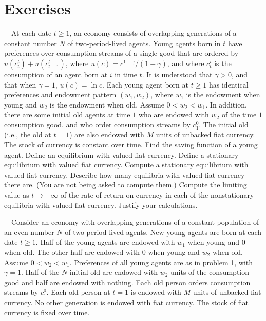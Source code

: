 \showchaptIDfalse
\showsectIDfalse
\section{Exercises}
\showchaptIDtrue
\showsectIDtrue
{} \ \  At each date $t \geq 1$, an  economy
consists of  overlapping generations of  a constant
number $N$ of two-period-lived agents.  Young
agents born in $t$ have preferences over consumption streams of
a single good that are ordered by
$ u(c_t^t) + u(c^t_{t+1}) $, where
$u(c) = c^{1 - \gamma} / (1-\gamma)$, and where $c^i_t$ is the
consumption of an agent born at $i$ in time $t$. It is understood
that $\gamma >0$, and that when $\gamma = 1$, $u(c) = \ln c$.   Each
young agent born at $t \geq 1$ has identical preferences and endowment
pattern
$(w_1,w_2)$, where $w_1$  is the endowment when young and  $w_2$
 is the endowment when old.
Assume $0 < w_2 < w_1$.
 In addition,
there are some initial old agents at time $1$ who
are endowed with $w_2$ of the time $1$ consumption good, and
who order consumption streams by $c^0_1$.   The initial old
(i.e., the old  at $t=1$)
are also endowed with $M$ units of unbacked fiat currency.  The
stock of currency is constant over time.
\medskip
{}    Find the saving function of a young agent.
\medskip
{}  Define an equilibrium with valued fiat
currency.
\medskip
{}   Define a stationary equilibrium with valued
fiat currency.
\medskip
{}  Compute a stationary equilibrium with valued
fiat currency.
\medskip
{}  Describe how many equilibria with
valued fiat currency there are.  (You are not being asked to
compute them.)
\medskip
{}  Compute the limiting value as $t \rightarrow + \infty$
of the rate of return on currency in each of the nonstationary
equilibria with valued fiat currency.  Justify your calculations.

\bigskip
{} \ \
  Consider an economy with overlapping generations
of a constant population of an even number  $N$ of  two-period-lived agents.
New young agents are born at each date $t\geq 1$.
Half of the young agents are endowed with
$w_1$ when young and $0$ when old.  The other half are
endowed with $0$ when young and  $w_2$ when old.
Assume $0 < w_2 < w_1$.
Preferences of all young agents are as in problem
1, with $\gamma =1$.   Half of the $N$ initial old are endowed
with $w_2$  units of the consumption good and half are endowed
with nothing.  Each old  person orders consumption streams by
$c^0_1$.  Each old person at $t=1$ is endowed with $M$ units
of unbacked fiat currency. No other generation is endowed with
fiat currency.  The stock of fiat currency is fixed over time.

